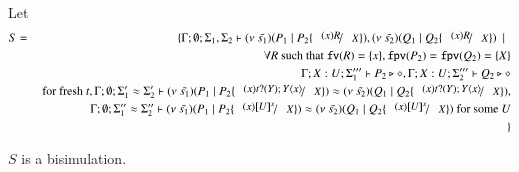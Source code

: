 
\begin{lemma}\rm
	\label{lem:subst_equiv}
	Let 
	\begin{eqnarray*}
		S &=& \set{ \Gamma; \es; \Sigma_1, \Sigma_2 \proves \newsp{\tilde{s_1}}{P_1 \Par P_2 \subst{(x) R}{X}}, \newsp{\tilde{s_2}}{Q_1 \Par Q_2 \subst{(x) R}{X}} \setbar \\
		&& \forall R \textrm{ such that } \fv{R} = \set{x}, \fpv{P_2} = \fpv{Q_2} = \set{X}\\
		&& \Gamma; X: U; \Sigma_1''' \proves P_2 \hastype \Proc, \Gamma; X: U; \Sigma_2''' \proves Q_2 \hastype \Proc\\
		&& \textrm{ for fresh } t, \Gamma; \es; \Sigma_1' \wb \Sigma_2' \proves \newsp{\tilde{s_1}}{P_1 \Par P_2 \subst{(x) \binp{t}{Y} \appl{Y}{x}}{X}} \wb \newsp{\tilde{s_2}}{Q_1 \Par Q_2 \subst{(x) \binp{t}{Y} \appl{Y}{x}}{X}}, \\
		&& \Gamma; \es; \Sigma_1'' \wb \Sigma_2'' \proves \newsp{\tilde{s_1}}{P_1 \Par P_2 \subst{(x) \map{U}^x}{X}} \wb \newsp{\tilde{s_2}}{Q_1 \Par Q_2 \subst{(x) \map{U}^x}{X}} \textrm{ for some } U \\
		&&}
	\end{eqnarray*}

	$S$ is a bisimulation.
\end{lemma}

